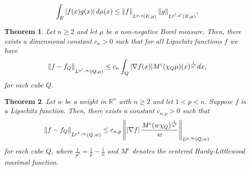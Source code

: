 \documentclass[10pt,a4paper]{amsart}
\newtheorem{theorem}{Theorem}
\newcommand{\R}{{\mathbb R}}
\newcommand{\strt}[1]{\rule{0pt}{#1}}
\begin{document}
\begin{equation}\label{Holder Lorentz}
	\int_{E} |f(x)g(x)|\,d\mu(x)
	\le \|f\|_{\strt{2.3ex} L^{p,q}(E,\mu)}\,\|g\|_{ \strt{2.3ex} L^{p',q'}(E,\mu)},
\end{equation}

\begin{theorem}\label{Thm FPW}
    Let $n\ge 2$ and let $\mu$ be a non-negative Borel measure. Then, there exists a dimensional constant $c_n>0$ such that for all Lipschitz functions $f$ we have
        \begin{equation}\label{Thm FPW Eq}
            \left\| f-f_Q\right\|_{\strt{2.3ex} L^{n',\infty}(Q,\mu)}
            \le c_n \int_Q |\nabla f(x)| M^c(\chi_Q\mu)(x)^\frac{1}{n'} dx,
        \end{equation}
    for each cube $Q$.
\end{theorem}

\begin{theorem}\label{Thm PS 4}
    Let $w$ be a weight in $\R^n$ with $n\ge 2$ and let $1<p<n$. Suppose $f$ is a Lipschitz function. Then, there exists a constant $c_{n,p}>0$ such that
        \begin{equation}\label{Thm PS 4 Eq}
            \left\| f-f_Q\right\|_{ \strt{2.3ex} L^{p^*,\infty}(Q,w)} \le c_{n,p} \left\| \left| \nabla f \right| \frac{M^c(w\chi_Q)^\frac{1}{n'}}{w} \right\|_{\strt{2.3ex} L^{p,\infty}(Q,w)}
        \end{equation}
    for each cube $Q$, where $\frac{1}{p^*}=\frac{1}{p}-\frac{1}{n}$ and $M^c$ denotes the centered Hardy-Littlewood maximal function.
\end{theorem}
\end{document}
